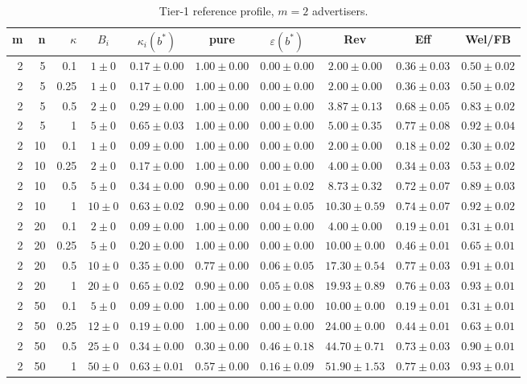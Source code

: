 \begin{table}[htbp]
\centering
\scriptsize
\caption{Tier-1 reference profile, $m=2$ advertisers.}
\label{tab:tier1_m2}
\begin{tabular}{@{}rrrccccccc@{}}
\toprule
m & n & $\kappa$ & $B_i$ & $\kappa_i(b^*)$ & pure & $\varepsilon(b^*)$ & Rev & Eff & Wel/FB \\
\midrule
2 & 5 & 0.1 & $1 \pm 0$ & $0.17 \pm 0.00$ & $1.00 \pm 0.00$ & $0.00 \pm 0.00$ & $2.00 \pm 0.00$ & $0.36 \pm 0.03$ & $0.50 \pm 0.02$ \\
2 & 5 & 0.25 & $1 \pm 0$ & $0.17 \pm 0.00$ & $1.00 \pm 0.00$ & $0.00 \pm 0.00$ & $2.00 \pm 0.00$ & $0.36 \pm 0.03$ & $0.50 \pm 0.02$ \\
2 & 5 & 0.5 & $2 \pm 0$ & $0.29 \pm 0.00$ & $1.00 \pm 0.00$ & $0.00 \pm 0.00$ & $3.87 \pm 0.13$ & $0.68 \pm 0.05$ & $0.83 \pm 0.02$ \\
2 & 5 & 1 & $5 \pm 0$ & $0.65 \pm 0.03$ & $1.00 \pm 0.00$ & $0.00 \pm 0.00$ & $5.00 \pm 0.35$ & $0.77 \pm 0.08$ & $0.92 \pm 0.04$ \\
2 & 10 & 0.1 & $1 \pm 0$ & $0.09 \pm 0.00$ & $1.00 \pm 0.00$ & $0.00 \pm 0.00$ & $2.00 \pm 0.00$ & $0.18 \pm 0.02$ & $0.30 \pm 0.02$ \\
2 & 10 & 0.25 & $2 \pm 0$ & $0.17 \pm 0.00$ & $1.00 \pm 0.00$ & $0.00 \pm 0.00$ & $4.00 \pm 0.00$ & $0.34 \pm 0.03$ & $0.53 \pm 0.02$ \\
2 & 10 & 0.5 & $5 \pm 0$ & $0.34 \pm 0.00$ & $0.90 \pm 0.00$ & $0.01 \pm 0.02$ & $8.73 \pm 0.32$ & $0.72 \pm 0.07$ & $0.89 \pm 0.03$ \\
2 & 10 & 1 & $10 \pm 0$ & $0.63 \pm 0.02$ & $0.90 \pm 0.00$ & $0.04 \pm 0.05$ & $10.30 \pm 0.59$ & $0.74 \pm 0.07$ & $0.92 \pm 0.02$ \\
2 & 20 & 0.1 & $2 \pm 0$ & $0.09 \pm 0.00$ & $1.00 \pm 0.00$ & $0.00 \pm 0.00$ & $4.00 \pm 0.00$ & $0.19 \pm 0.01$ & $0.31 \pm 0.01$ \\
2 & 20 & 0.25 & $5 \pm 0$ & $0.20 \pm 0.00$ & $1.00 \pm 0.00$ & $0.00 \pm 0.00$ & $10.00 \pm 0.00$ & $0.46 \pm 0.01$ & $0.65 \pm 0.01$ \\
2 & 20 & 0.5 & $10 \pm 0$ & $0.35 \pm 0.00$ & $0.77 \pm 0.00$ & $0.06 \pm 0.05$ & $17.30 \pm 0.54$ & $0.77 \pm 0.03$ & $0.91 \pm 0.01$ \\
2 & 20 & 1 & $20 \pm 0$ & $0.65 \pm 0.02$ & $0.90 \pm 0.00$ & $0.05 \pm 0.08$ & $19.93 \pm 0.89$ & $0.76 \pm 0.03$ & $0.93 \pm 0.01$ \\
2 & 50 & 0.1 & $5 \pm 0$ & $0.09 \pm 0.00$ & $1.00 \pm 0.00$ & $0.00 \pm 0.00$ & $10.00 \pm 0.00$ & $0.19 \pm 0.01$ & $0.31 \pm 0.01$ \\
2 & 50 & 0.25 & $12 \pm 0$ & $0.19 \pm 0.00$ & $1.00 \pm 0.00$ & $0.00 \pm 0.00$ & $24.00 \pm 0.00$ & $0.44 \pm 0.01$ & $0.63 \pm 0.01$ \\
2 & 50 & 0.5 & $25 \pm 0$ & $0.34 \pm 0.00$ & $0.30 \pm 0.00$ & $0.46 \pm 0.18$ & $44.70 \pm 0.71$ & $0.73 \pm 0.03$ & $0.90 \pm 0.01$ \\
2 & 50 & 1 & $50 \pm 0$ & $0.63 \pm 0.01$ & $0.57 \pm 0.00$ & $0.16 \pm 0.09$ & $51.90 \pm 1.53$ & $0.77 \pm 0.03$ & $0.93 \pm 0.01$ \\
\bottomrule
\end{tabular}
\end{table}
